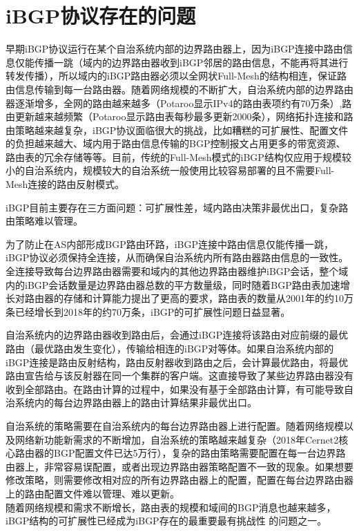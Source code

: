 \section{iBGP协议存在的问题}

早期iBGP协议运行在某个自治系统内部的边界路由器上，因为iBGP连接中路由信息仅能传播一跳（域内的边界路由器收到iBGP邻居的路由信息，不能再将其进行转发传播），所以域内的iBGP路由器必须以全网状Full-Mesh的结构相连，保证路由信息传输到每一台路由器。随着网络规模的不断扩大，自治系统内部的边界路由器逐渐增多，全网的路由越来越多（Potaroo\cite{bgptabledata}显示IPv4的路由表项约有70万条）,路由更新越来越频繁（Potaroo显示路由表每秒最多更新2000条），网络拓扑连接和路由策略越来越复杂，iBGP协议面临很大的挑战\cite{ibgp2016infocom}，比如糟糕的可扩展性、配置文件的负担越来越大、域内用于路由信息传输的BGP控制报文占用更多的带宽资源、路由表的冗余存储等等。目前，传统的Full-Mesh模式的iBGP结构仅应用于规模较小的自治系统内，规模较大的自治系统一般使用比较容易部署的且不需要Full-Mesh连接的路由反射\cite{rfc2796}模式。

iBGP\cite{Oprescu2011Rethinking}目前主要存在三方面问题：可扩展性差，域内路由决策非最优出口，复杂路由策略难以管理。

为了防止在AS内部形成BGP路由环路，iBGP连接中路由信息仅能传播一跳，iBGP协议必须保持全连接，从而确保自治系统内所有路由器路由信息的一致性。全连接导致每台边界路由器需要和域内的其他边界路由器维护iBGP会话，整个域内的iBGP会话数量是边界路由器总数的平方数量级，同时随着BGP路由表加速增长对路由器的存储和计算能力提出了更高的要求，路由表的数量从2001年的约10万条已经增长到2018年的约70万条，iBGP的可扩展性问题日益显著。

自治系统内的边界路由器收到路由后，会通过iBGP连接将该路由对应前缀的最优路由（最优路由发生变化），传输给相连的iBGP对等体。如果自治系统内部的iBGP连接是路由反射结构，路由反射器收到路由之后，会计算最优路由，将最优路由宣告给与该反射器在同一个集群的客户端。这直接导致了某些边界路由器没有收到全部路由。在路由计算的过程中，如果没有基于全部路由计算，有可能导致自治系统内的每台边界路由器上的路由计算结果非最优出口。

自治系统的策略需要在自治系统内的每台边界路由器上进行配置。随着网络规模以及网络新功能新需求的不断增加，自治系统的策略越来越复杂（2018年Cernet2核心路由器的BGP配置文件已达5万行），复杂的路由策略需要配置在每一台边界路由器上，非常容易误配置，或者出现边界路由器策略配置不一致的现象。如果想要修改策略，则需要修改相对应的所有边界路由器上的配置，配置在每台边界路由器上的路由配置文件难以管理、难以更新。\\

随着网络规模和需求不断增长，路由表的规模和域间的BGP消息也越来越多，iBGP结构的可扩展性已经成为iBGP存在的最重要最有挑战性 的问题之一。

